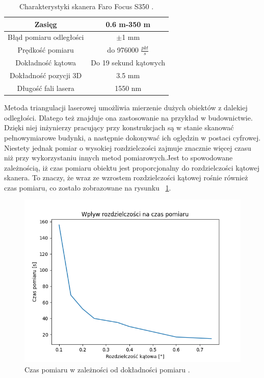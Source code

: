 \begin{table}[H]
\begin{center}
\caption{\label{tab:faroCharTab}Charakterystyki skanera Faro Focus S350 \cite{farofocusDatasheet}.}
\begin{tabular}{ |c| c| }
 \hline
 {\small Zasięg} & {\small 0.6 m-350 m}\\ 
  \hline
 {\small Błąd pomiaru odległości} & {\small $\pm$1 mm}\\  
 \hline
 {\small Prędkość pomiaru} & {\small do 976000 $\frac{pkt}{s}$ }\\  
  \hline
 {\small Dokładność kątowa} & {\small Do 19 sekund kątowych}  \\  
  \hline
  {\small Dokładność pozycji 3D} & {\small 3.5 mm}  \\  
  \hline
     {\small Długość fali lasera } & {\small 1550 nm}  \\  
  \hline
\end{tabular}
\end{center}
\end{table}
Metoda triangulacji laserowej umożliwia mierzenie dużych obiektów z dalekiej odległości. Dlatego też znajduje ona zastosowanie na przykład w budownictwie. Dzięki niej inżynierzy pracujący przy konstrukcjach są w stanie skanować pełnowymiarowe budynki, a następnie dokonywać ich oględzin w postaci cyfrowej. Niestety jednak pomiar o wysokiej rozdzielczości zajmuje znacznie więcej czasu niż przy wykorzystaniu innych metod pomiarowych.Jest to spowodowane zależnością, iż czas pomiaru obiektu jest proporcjonalny do rozdzielczości kątowej skanera. To znaczy, że wraz ze wzrostem rozdzielczości kątowej rośnie również czas pomiaru, co zostało zobrazowane na rysunku ~\ref{fig:lasertriangchart}.
\begin{figure}[H]
  \centering
  \includegraphics[scale=0.6]{wplywRozdzielczosci.png}
  \caption{Czas pomiaru w zależności od dokładności pomiaru \cite{el2008integrating}.}   
  \label{fig:lasertriangchart}
\end{figure}